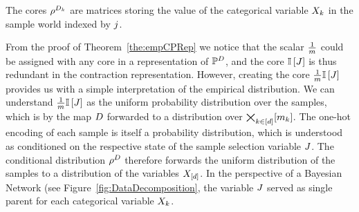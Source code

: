 The cores $\rho^{D_{k}}$ are matrices storing the value of the categorical variable $X_{k}$ in the sample world indexed by $j$.

From the proof of Theorem~\ref{the:empCPRep} we notice that the scalar $\frac{1}{m}$ could be assigned with any core in a representation of $\mathbb{P}^{D}$, and the core $\mathbb{I}\left[J\right]$ is thus redundant in the contraction representation.
However, creating the core $\frac{1}{m}\mathbb{I}\left[J\right]$ provides us with a simple interpretation of the empirical distribution.
We can understand $\frac{1}{m}\mathbb{I}\left[J\right]$ as the uniform probability distribution over the samples, which is by the map $D$ forwarded to a distribution over $\bigtimes_{k\in[d]}[m_{k}]$.
The one-hot encoding of each sample is itself a probability distribution, which is understood as conditioned on the respective state of the sample selection variable $J$.
The conditional distribution $\rho^{D}$ therefore forwards the uniform distribution of the samples to a distribution of the variables $X_{[d]}$.
In the perspective of a Bayesian Network (see Figure~\ref{fig:DataDecomposition}, the variable $J$ served as single parent for each categorical variable $X_{k}$.





